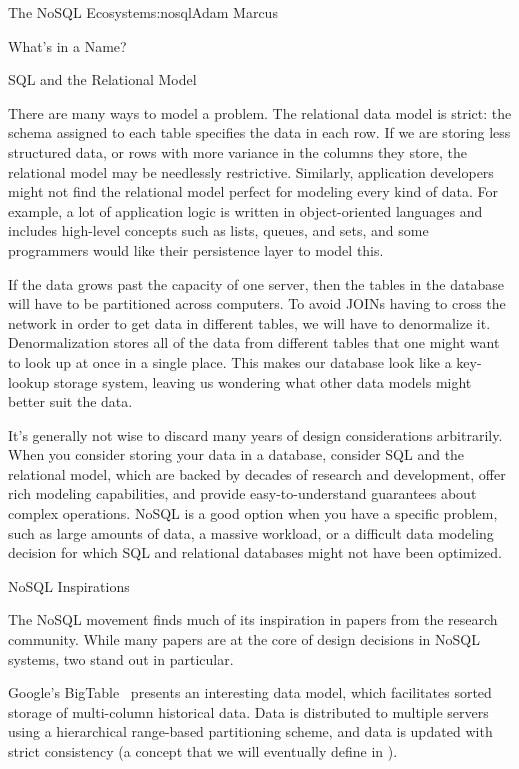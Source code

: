 \begin{aosachapter}{The NoSQL Ecosystem}{s:nosql}{Adam Marcus}
\begin{aosasect1}{What's in a Name?}
\begin{aosasect2}{SQL and the Relational Model}
\begin{aosaitemize}
  \item There are many ways to model a problem.  The relational data
  model is strict: the schema assigned to each table specifies the
  data in each row.  If we are storing less structured data, or rows
  with more variance in the columns they store, the relational model
  may be needlessly restrictive.  Similarly, application developers
  might not find the relational model perfect for modeling every kind
  of data.  For example, a lot of application logic is written in
  object-oriented languages and includes high-level concepts such as
  lists, queues, and sets, and some programmers would like their
  persistence layer to model this.

  \item If the data grows past the capacity of one server, then the
  tables in the database will have to be partitioned across computers.
  To avoid JOINs having to cross the network in order to get data in
  different tables, we will have to denormalize it.  Denormalization
  stores all of the data from different tables that one might want to
  look up at once in a single place.  This makes our database look
  like a key-lookup storage system, leaving us wondering what other
  data models might better suit the data.

\end{aosaitemize}

It's generally not wise to discard many years of design considerations
arbitrarily.  When you consider storing your data in a database,
consider SQL and the relational model, which are backed by decades of
research and development, offer rich modeling capabilities, and
provide easy-to-understand guarantees about complex operations.  NoSQL
is a good option when you have a specific problem, such as large
amounts of data, a massive workload, or a difficult data modeling
decision for which SQL and relational databases might not have been
optimized.

\end{aosasect2}

\begin{aosasect2}{NoSQL Inspirations}

The NoSQL movement finds much of its inspiration in papers from the
research community.  While many papers are at the core of design
decisions in NoSQL systems, two stand out in particular.

Google's BigTable~\cite{bib:bigtable} presents an interesting data model,
which facilitates sorted storage of multi-column historical data.
Data is distributed to multiple servers using a hierarchical
range-based partitioning scheme, and data is updated with strict
consistency (a concept that we will eventually define in
).


\end{aosasect2}
\end{aosasect1}
\end{aosachapter}
